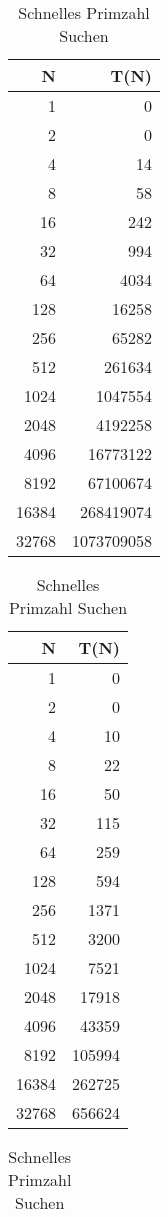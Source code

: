 \documentclass[paper=a4, fontsize=11pt]{scrartcl} %
\numberwithin{equation}{section} %
\numberwithin{figure}{section} %
\numberwithin{table}{section} %
\begin{document}
\begin{table}[h!]
  \parbox{.5\linewidth}{
  \centering
  \begin{tabular}{ r | r }
    N & T(N) \\
    \hline
    1 & 0 \\
    2 & 0 \\
    4 & 14 \\
    8 & 58 \\
    16 & 242 \\
    32 & 994 \\
    64 & 4034 \\
    128 & 16258 \\
    256 & 65282 \\
    512 & 261634 \\
    1024 & 1047554 \\
    2048 & 4192258 \\
    4096 & 16773122 \\
    8192 & 67100674 \\
    16384 & 268419074 \\
    32768 & 1073709058 \\
  \end{tabular}
  \caption{Langsames Primzahl Suchen}
  \label{table:1}
  }
  \parbox{.5\linewidth}{
  \centering
  \begin{tabular}{ r | r }
    N & T(N) \\
    \hline
    1 & 0 \\
    2 & 0 \\
    4 & 10 \\
    8 & 22 \\
    16 & 50 \\
    32 & 115 \\
    64 & 259 \\
    128 & 594 \\
    256 & 1371 \\
    512 & 3200 \\
    1024 & 7521 \\
    2048 & 17918 \\
    4096 & 43359 \\
    8192 & 105994 \\
    16384 & 262725 \\
    32768 & 656624 \\
  \end{tabular}
  \caption{Schnelles Primzahl Suchen}
  \label{table:2}
  }
  \parbox{.5\linewidth}{
    \centering
    \begin{tabular}{ r | r }

\end{tabular}}
\end{table}
\end{document}
